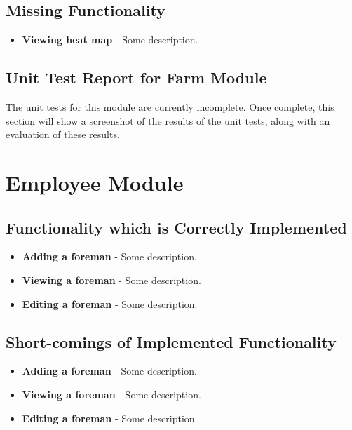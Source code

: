 \documentclass[11pt,fleqn]{book} %
\begin{document}
	\section{Missing Functionality}
		\begin{itemize}
			\item\textbf{Viewing heat map} -
			Some description.
		\end{itemize}
	\section{Unit Test Report for Farm Module}
		The unit tests for this module are currently incomplete. Once complete, this section will show a screenshot of the results of the unit tests, along with an evaluation of these results.



\chapter{Employee Module}
	\section{Functionality which is Correctly Implemented}
		\begin{itemize}
			\item\textbf{Adding a foreman} -
			Some description. 
			
			\item\textbf{Viewing a foreman} -
			Some description.
			
			\item\textbf{Editing a foreman} -
			Some description.
		\end{itemize}
	\section{Short-comings of Implemented Functionality}
		\begin{itemize}
			\item\textbf{Adding a foreman} -
			Some description. 
			
			\item\textbf{Viewing a foreman} -
			Some description.
			
			\item\textbf{Editing a foreman} -
			Some description.
		\end{itemize}
\end{document}
